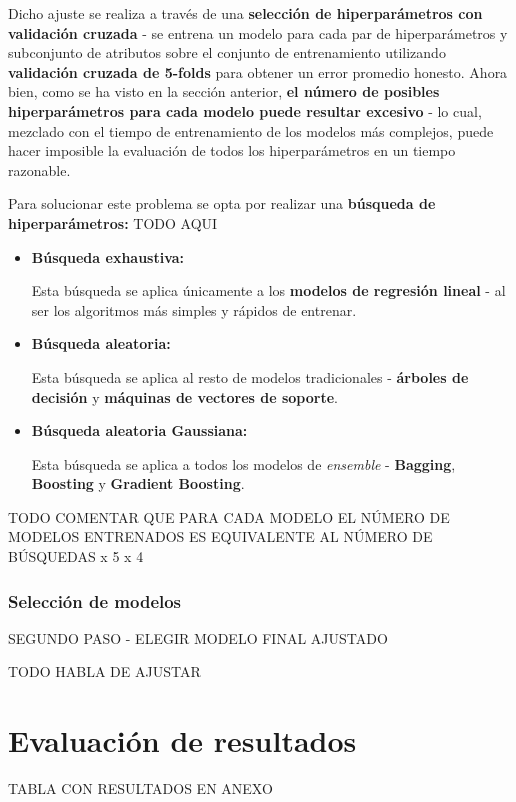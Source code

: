 Dicho ajuste se realiza a través de una \textbf{selección de hiperparámetros con validación cruzada} - se entrena un modelo para cada par de hiperparámetros y subconjunto de atributos sobre el conjunto de entrenamiento utilizando \textbf{validación cruzada de 5-folds} para obtener un error promedio honesto. Ahora bien, como se ha visto en la sección anterior, \textbf{el número de posibles hiperparámetros para cada modelo puede resultar excesivo} - lo cual, mezclado con el tiempo de entrenamiento de los modelos más complejos, puede hacer imposible la evaluación de todos los hiperparámetros en un tiempo razonable. 

Para solucionar este problema se opta por realizar una \textbf{búsqueda de hiperparámetros:} TODO AQUI

\begin{itemize}[parsep=2pt, itemsep=2pt, topsep=4pt]
	\item \textbf{Búsqueda exhaustiva:}
	
	Esta búsqueda se aplica únicamente a los \textbf{modelos de regresión lineal} - al ser los algoritmos más simples y rápidos de entrenar.
	\item \textbf{Búsqueda aleatoria:}
	
	Esta búsqueda se aplica al resto de modelos tradicionales - \textbf{árboles de decisión} y \textbf{máquinas de vectores de soporte}.
	\item \textbf{Búsqueda aleatoria Gaussiana:}
	
	Esta búsqueda se aplica a todos los modelos de \textit{ensemble} - \textbf{Bagging}, \textbf{Boosting} y \textbf{Gradient Boosting}.
\end{itemize}

TODO COMENTAR QUE PARA CADA MODELO EL NÚMERO DE MODELOS ENTRENADOS ES EQUIVALENTE AL NÚMERO DE BÚSQUEDAS x 5 x 4

\subsubsection{Selección de modelos}

SEGUNDO PASO - ELEGIR MODELO FINAL AJUSTADO

TODO HABLA DE AJUSTAR

\section{Evaluación de resultados}

TABLA CON RESULTADOS EN ANEXO


